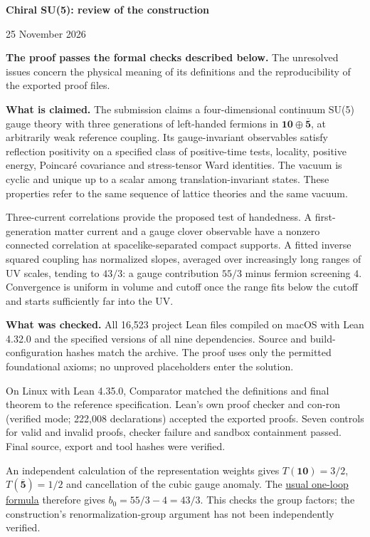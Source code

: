 \documentclass[11pt]{article}
\begin{document}
\begin{center}
{\Large\bfseries Chiral SU(5): review of the construction}\par
\vspace{3pt}
25 November 2026
\end{center}
\vspace{-4pt}

\textbf{The proof passes the formal checks described below.}
The unresolved issues concern the physical meaning of its definitions and
the reproducibility of the exported proof files.

\textbf{What is claimed.}
The submission claims a four-dimensional continuum SU(5) gauge theory with
three generations of left-handed fermions in
$\mathbf{10}\oplus\overline{\mathbf5}$, at arbitrarily weak reference coupling.
Its gauge-invariant observables satisfy reflection positivity on a specified
class of positive-time tests, locality, positive energy, Poincar\'e covariance
and stress-tensor Ward identities. The vacuum is cyclic and unique up to a
scalar among translation-invariant states. These properties refer to the same
sequence of lattice theories and the same vacuum.

Three-current correlations provide the proposed test of handedness. A
first-generation matter current and a gauge clover observable have a nonzero
connected correlation at spacelike-separated compact supports. A fitted
inverse squared coupling has normalized slopes, averaged over increasingly
long ranges of UV scales, tending to $43/3$: a gauge contribution
$55/3$ minus fermion screening $4$. Convergence is uniform in volume and
cutoff once the range fits below the cutoff and starts sufficiently far
into the UV.

\textbf{What was checked.}
All 16,523 project Lean files compiled on macOS with Lean 4.32.0 and the
specified versions of all nine dependencies. Source and build-configuration hashes
match the archive. The proof uses only the permitted foundational axioms;
no unproved placeholders enter the solution.

On Linux with Lean 4.35.0, Comparator matched the definitions and final theorem
to the reference specification. Lean's own proof checker and con-ron
(verified mode; 222,008 declarations) accepted the exported proofs. Seven
controls for valid and invalid proofs, checker failure and sandbox containment
passed. Final source, export and tool hashes were verified.

An independent calculation of the representation weights gives
$T(\mathbf{10})=3/2$, $T(\overline{\mathbf5})=1/2$ and cancellation of the
cubic gauge anomaly. The
\href{https://www-hep.phys.s.u-tokyo.ac.jp/~yujitach/tmp/dummies/dummiessu8.html}{usual one-loop formula}
therefore gives $b_0=55/3-4=43/3$. This checks the group factors; the
construction's renormalization-group argument has not been independently verified.
\end{document}
